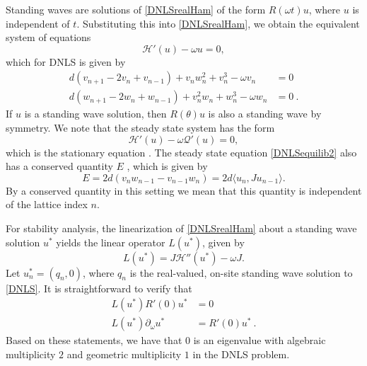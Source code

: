 \documentclass[thesis.tex]{subfiles}
\begin{document}
Standing waves are solutions of \cref{DNLSrealHam} of the form $R(\omega t) u$, where $u$ is independent of $t$. Substituting this into \cref{DNLSrealHam}, we obtain the equivalent system of equations
\begin{equation}\label{DNLSequilib1}
\mathcal{H}'(u) - \omega u = 0,
\end{equation}
which for DNLS is given by
\begin{equation}\label{DNLSequilib2}
\begin{aligned}
d (v_{n+1} - 2 v_n + v_{n-1}) + v_n w_n^2 + v_n^3 - \omega v_n &= 0 \\
d (w_{n+1} - 2 w_n + w_{n-1}) + v_n^2 w_n + w_n^3 - \omega w_n &= 0 \:.
\end{aligned} 
\end{equation}
If $u$ is a standing wave solution, then $R(\theta) u$ is also a standing wave by symmetry. We note that the steady state system has the form
\begin{equation}
\mathcal{H}'(u) - \omega \mathcal{Q}'(u) = 0,
\end{equation}
which is the stationary equation \cite[(2.15)]{Grillakis1987}. The steady state equation \cref{DNLSequilib2} also has a conserved quantity $E$ \cite{Johansson2000}, which is given by
\begin{equation}\label{DNLSE}
E = 2d(v_n w_{n-1} - v_{n-1} w_n) = 2d \langle u_n, J u_{n-1} \rangle.
\end{equation}
By a conserved quantity in this setting we mean
that this quantity is independent of the lattice
index $n$.

For stability analysis, the linearization of \cref{DNLSrealHam} about a standing wave solution $u^*$ 
yields the linear operator $L(u^*)$, given by 
\begin{equation}\label{DNLSeigproblem}
L(u^*) = J \mathcal{H}''(u^*)  - \omega J.
\end{equation}
Let $u^*_n = (q_n, 0)$, where $q_n$ is the real-valued, on-site standing wave solution to \cref{DNLS}. It is straightforward to verify that
\begin{equation}\label{DNLSkernel1}
\begin{aligned}
L(u^*) R'(0) u^* &= 0 \\
L(u^*) \partial_\omega u^* &= R'(0) u^* \:.
\end{aligned}
\end{equation}
Based on these statements, we have that $0$ is an
eigenvalue with algebraic multiplicity $2$ and
geometric multiplicity $1$ in the DNLS problem.



\iffulldocument\else
	
	
\fi
\end{document}
